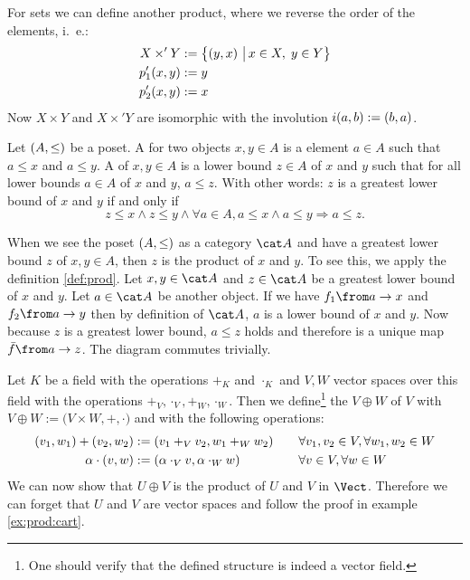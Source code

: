 \begin{example}
  \label{ex:prod:cart2}
  For sets we can define another product, where we reverse the order of the elements, i.~e.:
  \begin{alignat*}{2}
    X \times' Y &:= \bigl \{ \left( y , x \right) \,\big|\, x \in X, \; y \in Y \bigr \} \\
    p'_1(x,y)   &:= y \\
    p'_2(x,y)   &:= x
  \end{alignat*}
  Now $X \times Y$ and $X \times' Y$ are isomorphic with the involution $i(a, b) := \left( b , a \right)$.
\end{example}

\begin{example}[Posets]
  \label{ex:prod:poset}
  Let $\left( A , \le \right)$ be a poset.
  A  for two objects $x, y \in A$ is a element $a \in A$ such that $a \le x$ and $a \le y$.
  A  of $x, y \in A$ is a lower bound $z \in A$ of $x$ and $y$ such that for all lower bounds $a \in A$ of $x$ and $y$, $a \le z$.
  With other words: $z$ is a greatest lower bound of $x$ and $y$ if and only if
  $$z \le x \land z \le y \land \forall a \in A, a \le x \land a \le y \Rightarrow a \le z.$$

  When we see the poset $\left( A , \le \right)$ as a category $\catA$ and have a greatest lower bound $z$ of $x, y \in A$, then $z$ is the product of $x$ and $y$.
  To see this, we apply the definition \ref{def:prod}.
  Let $x, y \in \catA$ and $z \in \catA$ be a greatest lower bound of $x$ and $y$.
  Let $a \in \catA$ be another object.
  If we have $f_1 \from a \to x$ and $f_2 \from a \to y$ then by definition of $\catA$, $a$ is a lower bound of $x$ and $y$.
  Now because $z$ is a greatest lower bound, $a \le z$ holds and therefore is a unique map $\fbar \from a \to z$.
  The diagram commutes trivially.
\end{example}

\begin{example}
  \label{ex:prod:vspace}
  Let $K$ be a field with the operations $+_K$ and $\cdot_K$ and $V, W$ vector spaces over this field with the operations $+_V, \cdot_V, +_W, \cdot_W$.
  Then we define\footnote{One should verify that the defined structure is indeed a vector field.}
  the  $V \oplus W$ of $V$ with $V \oplus W := \bigl(V \times W, +, \cdot \bigr)$ and with the following operations:
  \begin{alignat*}{4}
    \left( v_1 , w_1 \right) + \left( v_2 , w_2 \right) &:= \left( v_1 +_V v_2 , w_1 +_W w_2 \right)           &\quad& \forall v_1, v_2 \in V, \forall w_1, w_2 \in W \\
    \alpha \cdot \left( v , w \right)          &:= \left( \alpha \cdot_V v , \alpha \cdot_W w \right) &     & \forall v \in V, \forall w \in W
  \end{alignat*}
  We can now show that $U \oplus V$ is the product of $U$ and $V$ in $\Vect$.
  Therefore we can forget that $U$ and $V$ are vector spaces and follow the proof in example \ref{ex:prod:cart}.
\end{example}

